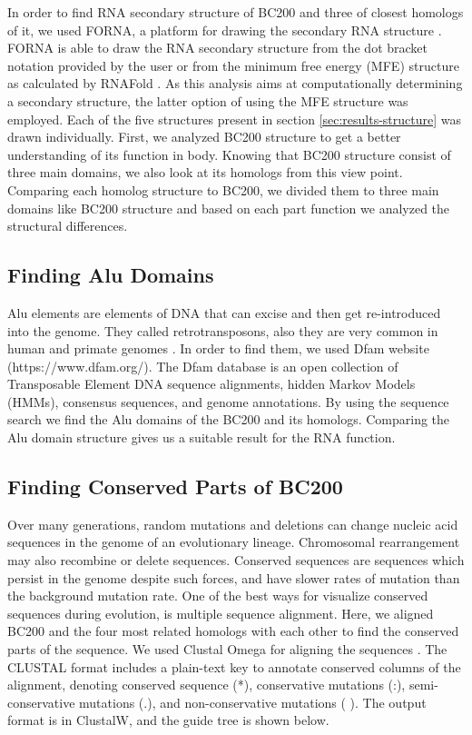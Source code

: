 \documentclass[conference, 11pt]{IEEEtran}
\begin{document}
In order to find RNA secondary structure of BC200 and three of closest homologs of it, we used FORNA, a platform for drawing the secondary RNA structure \cite{kerpedjiev2015forna}. 
FORNA is able to draw the RNA secondary structure from the dot bracket notation provided by the user or from the minimum free energy (MFE) structure as calculated by RNAFold \cite{lorenz2011viennarna}. 
As this analysis aims at computationally determining a secondary structure, the latter option of using the MFE structure was employed. 
Each of the five structures present in section \ref{sec:results-structure} was drawn individually. 
First, we analyzed BC200 structure to get a better understanding of its function in body. 
Knowing that BC200 structure consist of three main domains, we also look at its homologs from this view point. 
Comparing each homolog structure to BC200, we divided them to three main domains like BC200 structure and based on each part function we analyzed the structural differences.

\subsection{Finding Alu Domains}

Alu elements are elements of DNA that can excise and then get re-introduced into the genome. 
They called retrotransposons, also they are very common in human and primate genomes \cite{dombroski1994vivo}. 
In order to find them, we used Dfam website (https://www.dfam.org/). 
The Dfam database is an open collection of Transposable Element DNA sequence alignments, hidden Markov Models (HMMs), consensus sequences, and genome annotations. 
By using the sequence search we find the Alu domains of the BC200 and its homologs. 
Comparing the Alu domain structure gives us a suitable result for the RNA function.

\subsection{Finding Conserved Parts of BC200}
Over many generations, random mutations and deletions can change nucleic acid sequences in the genome of an evolutionary lineage. 
Chromosomal rearrangement may also recombine or delete sequences. 
Conserved sequences are sequences which persist in the genome despite such forces, and have slower rates of mutation than the background mutation rate\cite{kimura1974some}.
One of the best ways for visualize conserved sequences during evolution, is multiple sequence alignment. 
Here, we aligned BC200 and the four most related homologs with each other to find the conserved parts of the sequence. 
We used Clustal Omega for aligning the sequences \cite{madeira2019embl}. 
The CLUSTAL format includes a plain-text key to annotate conserved columns of the alignment, denoting conserved sequence (*), conservative mutations (:), semi-conservative mutations (.), and non-conservative mutations ( ). 
The output format is in ClustalW, and the guide tree is shown below.
\end{document}
